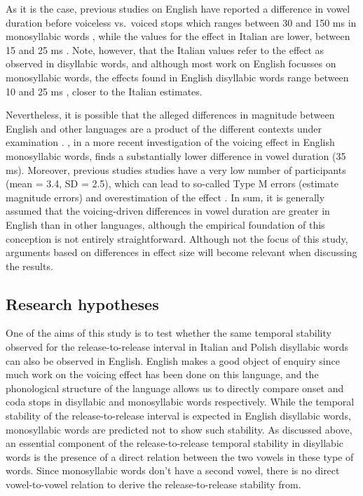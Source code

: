 \documentclass[12pt,a4paper,]{article}
\begin{document}
As it is the case, previous studies on English have reported a
difference in vowel duration before voiceless vs.~voiced stops which
ranges between 30 and 150 ms in monosyllabic words
\citep{heffner1937, house1953, zimmerman1958, peterson1960, sharf1962, chen1970, klatt1973, port1981, mack1982, luce1985, laeufer1992, ko2018},
while the values for the effect in Italian are lower, between 15 and 25
ms \citep{caldognetto1979, farnetani1986, esposito2002, coretta2019k}.
Note, however, that the Italian values refer to the effect as observed
in disyllabic words, and although most work on English focusses on
monosyllabic words, the effects found in English disyllabic words range
between 10 and 25 ms \citep{sharf1962, klatt1973, port1981, davis1989},
closer to the Italian estimates.

Nevertheless, it is possible that the alleged differences in magnitude
between English and other languages are a product of the different
contexts under examination \citep{laeufer1992}. \citet{ko2018}, in a
more recent investigation of the voicing effect in English monosyllabic
words, finds a substantially lower difference in vowel duration (35 ms).
Moreover, previous studies studies have a very low number of
participants (mean = 3.4, SD = 2.5), which can lead to so-called Type M
errors (estimate magnitude errors) and overestimation of the effect
\citep{kirby2018, roettger2019}. In sum, it is generally assumed that
the voicing-driven differences in vowel duration are greater in English
than in other languages, although the empirical foundation of this
conception is not entirely straightforward. Although not the focus of
this study, arguments based on differences in effect size will become
relevant when discussing the results.

\hypertarget{research-hypotheses}{%
\subsection{Research hypotheses}\label{research-hypotheses}}

\label{s:hypo}

One of the aims of this study is to test whether the same temporal
stability observed for the release-to-release interval in Italian and
Polish disyllabic words can also be observed in English. English makes a
good object of enquiry since much work on the voicing effect has been
done on this language, and the phonological structure of the language
allows us to directly compare onset and coda stops in disyllabic and
monosyllabic words respectively. While the temporal stability of the
release-to-release interval is expected in English disyllabic words,
monosyllabic words are predicted not to show such stability. As
discussed above, an essential component of the release-to-release
temporal stability in disyllabic words is the presence of a direct
relation between the two vowels in these type of words. Since
monosyllabic words don't have a second vowel, there is no direct
vowel-to-vowel relation to derive the release-to-release stability from.
\end{document}
